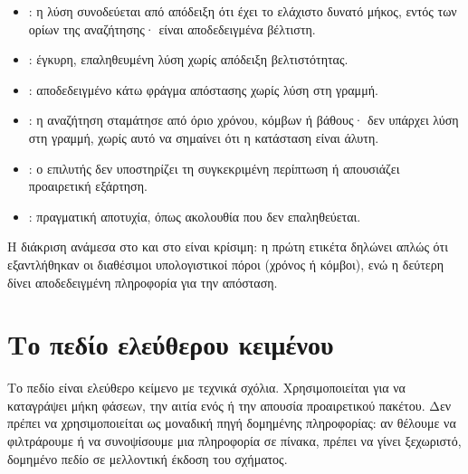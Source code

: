 \begin{itemize}
\item {}: η λύση συνοδεύεται από απόδειξη ότι έχει το ελάχιστο δυνατό μήκος, εντός των ορίων της αναζήτησης· είναι αποδεδειγμένα βέλτιστη.
\item {}: έγκυρη, επαληθευμένη λύση χωρίς απόδειξη βελτιστότητας.
\item {}: αποδεδειγμένο κάτω φράγμα απόστασης χωρίς λύση στη γραμμή.
\item {}: η αναζήτηση σταμάτησε από όριο χρόνου, κόμβων ή βάθους· δεν υπάρχει λύση στη γραμμή, χωρίς αυτό να σημαίνει ότι η κατάσταση είναι άλυτη.
\item {}: ο επιλυτής δεν υποστηρίζει τη συγκεκριμένη περίπτωση ή απουσιάζει προαιρετική εξάρτηση.
\item {}: πραγματική αποτυχία, όπως ακολουθία που δεν επαληθεύεται.
\end{itemize}

Η διάκριση ανάμεσα στο  και στο  είναι κρίσιμη: η πρώτη ετικέτα δηλώνει απλώς ότι εξαντλήθηκαν οι διαθέσιμοι υπολογιστικοί πόροι (χρόνος ή κόμβοι), ενώ η δεύτερη δίνει αποδεδειγμένη πληροφορία για την απόσταση.

\section{Το πεδίο ελεύθερου κειμένου}
\label{sec:schema-notes}
Το πεδίο  είναι ελεύθερο κείμενο με τεχνικά σχόλια. Χρησιμοποιείται για να καταγράψει μήκη φάσεων, την αιτία ενός  ή την απουσία προαιρετικού πακέτου. Δεν πρέπει να χρησιμοποιείται ως μοναδική πηγή δομημένης πληροφορίας: αν θέλουμε να φιλτράρουμε ή να συνοψίσουμε μια πληροφορία σε πίνακα, πρέπει να γίνει ξεχωριστό, δομημένο πεδίο σε μελλοντική έκδοση του σχήματος.

